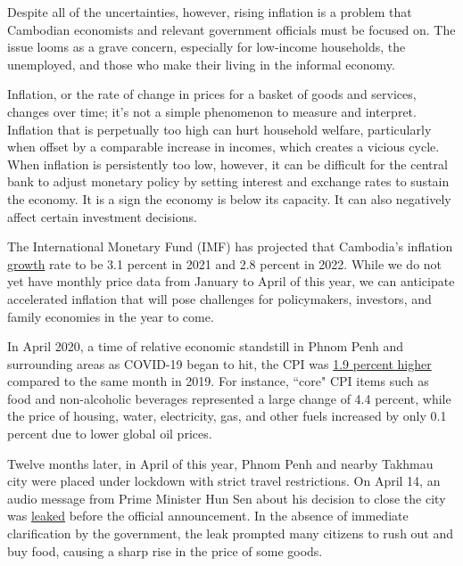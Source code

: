\documentclass[10pt,a4paper]{letter}
\begin{document}
Despite all of the uncertainties, however, rising inflation is a problem that Cambodian economists and relevant government officials must be focused on. The issue looms as a grave concern, especially for low-income households, the unemployed, and those who make their living in the informal economy.

Inflation, or the rate of change in prices for a basket of goods and services, changes over time; it's not a simple phenomenon to measure and interpret. Inflation that is perpetually too high can hurt household welfare, particularly when offset by a comparable increase in incomes, which creates a vicious cycle. When inflation is persistently too low, however, it can be difficult for the central bank to adjust monetary policy by setting interest and exchange rates to sustain the economy. It is a sign the economy is below its capacity. It can also negatively affect certain investment decisions.

The International Monetary Fund (IMF) has projected that Cambodia's inflation \href{https://www.imf.org/-/media/Files/Publications/WEO/2021/April/English/text.ashx}{growth} rate to be 3.1 percent in 2021 and 2.8 percent in 2022. While we do not yet have monthly price data from January to April of this year, we can anticipate accelerated inflation that will pose challenges for policymakers, investors, and family economies in the year to come.

In April 2020, a time of relative economic standstill in Phnom Penh and surrounding areas as COVID-19 began to hit, the CPI was \href{https://www.nis.gov.kh/nis/cpi/2020/PP_CPI%20summary%20table%20Apr%202020.htm}{1.9 percent higher} compared to the same month in 2019. For instance, ``core" CPI items such as food and non-alcoholic beverages represented a large change of 4.4 percent, while the price of housing, water, electricity, gas, and other fuels increased by only 0.1 percent due to lower global oil prices.

Twelve months later, in April of this year, Phnom Penh and nearby Takhmau city were placed under lockdown with strict travel restrictions. On April 14, an audio message from Prime Minister Hun Sen about his decision to close the city was \href{https://www.phnompenhpost.com/national/pm-officials-be-punished-leaking-audio-lockdown-order}{leaked} before the official announcement. In the absence of immediate clarification by the government, the leak prompted many citizens to rush out and buy food, causing a sharp rise in the price of some goods.
\end{document}
